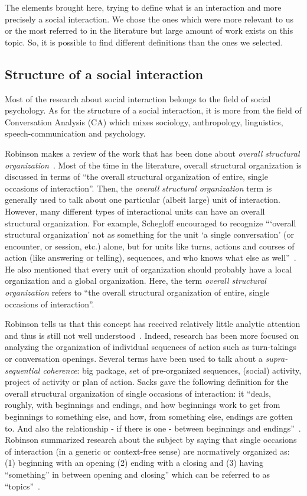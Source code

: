 \documentclass[a4paper,11pt,twoside]{StyleThese}
\begin{document}
The elements brought here, trying to define what is an interaction and more precisely a social interaction. We chose the ones which were more relevant to us or the most referred to in the literature but large amount of work exists on this topic. So, it is possible to find different definitions than the ones we selected.

\subsection{Structure of a social interaction}\label{chap1:subsec:social_int}
Most of the research about social interaction belongs to the field of social psychology. As for the structure of a social interaction, it is more from the field of Conversation Analysis (CA) which mixes sociology, anthropology, linguistics, speech-communication and psychology.

Robinson makes a review of the work that has been done about \emph{overall structural organization}~\cite{robinson_overall_2012}. Most of the time in the literature, overall structural organization is discussed in terms of ``the overall structural organization of entire, single occasions of interaction''. Then, the \emph{overall structural organization} term is generally used to talk about one particular (albeit large) unit of interaction. However, many different types of interactional units can have an overall structural organization. For example, Schegloff encouraged to recognize ``‘overall structural organization’ not as something for the unit ‘a single conversation’ (or encounter, or session, etc.) alone, but for units like turns, actions and courses of action (like answering or telling), sequences, and who knows what else as well''~\cite{schegloff_2011_word}. He also mentioned that every unit of organization should probably have a local organization and a global organization. Here, the term \emph{overall structural organization} refers to ``the overall structural organization of entire, single occasions of interaction''. 

Robinson tells us that this concept has received relatively little analytic attention and thus is still not well understood~\cite{robinson_overall_2012}. Indeed, research has been more focused on analyzing the organization of individual sequences of action such as turn-takings or conversation openings. Several terms have been used to talk about a \emph{supra-sequential coherence}: big package, set of pre-organized sequences, (social) activity, project of activity or plan of action. Sacks gave the following definition for the overall structural organization of single occasions of interaction: it ``deals, roughly, with beginnings and endings, and how beginnings work to get from beginnings to something else, and how, from something else, endings are gotten to. And also the relationship - if there is one - between beginnings and endings''~\cite[p.~157]{sacks_lectures_1995}. Robinson summarized research about the subject by saying that single occasions of interaction (in a generic or context-free sense) are normatively organized as: (1) beginning with an opening (2) ending with a closing and (3) having ``something'' in between opening and closing'' which can be referred to as ``topics''~\cite{robinson_overall_2012}.
\end{document}
